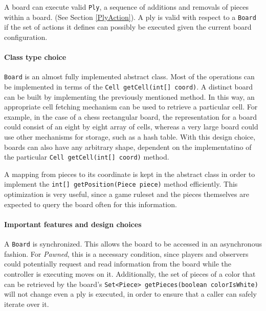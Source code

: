 	 		 													 A board can execute valid \texttt{Ply}, a sequence
	 		 													 of additions and removals of pieces within a board. (See Section 
	 		 													 \ref{PlyAction}). A ply is valid with respect to a 
	 		 													 \texttt{Board} if the set of actions it defines can possibly 
	 		 													 be executed given the current board configuration.   

					\paragraph{Class type choice} \texttt{Board} is an almost fully implemented abstract class. 
																				Most of the operations can be implemented in terms of the 
																				\texttt{Cell getCell(int[] coord)}. A distinct board can be built
																				by implementing the previously mentioned method. In this way, 
																				an appropriate cell fetching mechanism can be used to retrieve
																				a particular cell. For example, in the case of a chess rectangular
																				board, the representation for a board could consist of an eight 
																				by eight array of cells, whereas a very large board could use 
																				other mechanisms for storage, such as a hash table. With this
																				design choice, boards can also have any arbitrary shape, 
																				dependent on the implementatino of the particular 
																				\texttt{Cell getCell(int[] coord)} method. 
																				
																				A mapping from pieces to its coordinate is kept in the abstract
																				class in order to implement the \texttt{int[] getPosition(Piece piece)}
																				method efficiently. This optimization is very useful, since 
																				a game ruleset and the pieces themselves are expected to query the
																				board often for this information. 


					\paragraph{Important features and design choices}
												A \texttt{Board} is synchronized. This allows the board to be accessed in an
												asynchronous fashion. For \emph{Pawned}, this is a necessary condition, since
												players and observers could potentially request and read information from the 
												board while the controller is executing moves on it. Additionally, the set
												of pieces of a color that can be retrieved by the board's 
												\texttt{Set<Piece> getPieces(boolean colorIsWhite)} will not change even a ply 
												is executed, in order to ensure that a caller can safely iterate over it. 
																								
